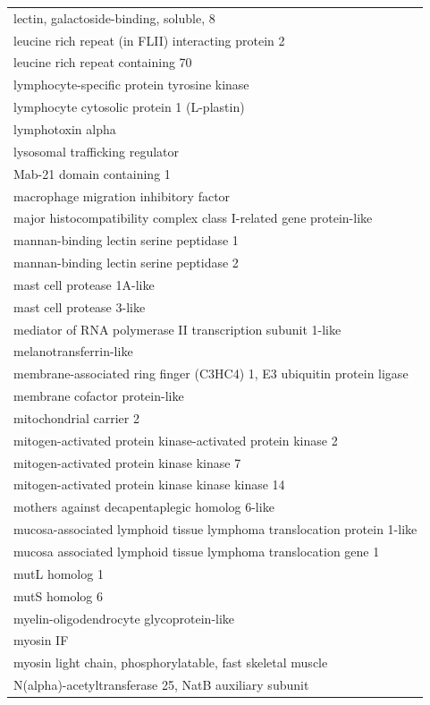 \documentclass[english]{article}\usepackage[]{graphicx}\usepackage[]{color}
\begin{document}
\begin{longtable}{l}
lectin, galactoside-binding, soluble, 8 \\ 
leucine rich repeat (in FLII) interacting protein 2 \\ 
leucine rich repeat containing 70 \\ 
lymphocyte-specific protein tyrosine kinase \\ 
lymphocyte cytosolic protein 1 (L-plastin) \\ 
lymphotoxin alpha \\ 
lysosomal trafficking regulator \\ 
Mab-21 domain containing 1 \\ 
macrophage migration inhibitory factor \\ 
major histocompatibility complex class I-related gene protein-like \\ 
mannan-binding lectin serine peptidase 1  \\ 
mannan-binding lectin serine peptidase 2 \\ 
mast cell protease 1A-like \\ 
mast cell protease 3-like \\ 
mediator of RNA polymerase II transcription subunit 1-like \\ 
melanotransferrin-like \\ 
membrane-associated ring finger (C3HC4) 1, E3 ubiquitin protein ligase \\ 
membrane cofactor protein-like \\ 
mitochondrial carrier 2 \\ 
mitogen-activated protein kinase-activated protein kinase 2 \\ 
mitogen-activated protein kinase kinase 7 \\ 
mitogen-activated protein kinase kinase kinase 14 \\ 
mothers against decapentaplegic homolog 6-like \\ 
mucosa-associated lymphoid tissue lymphoma translocation protein 1-like \\ 
mucosa associated lymphoid tissue lymphoma translocation gene 1 \\ 
mutL homolog 1 \\ 
mutS homolog 6 \\ 
myelin-oligodendrocyte glycoprotein-like \\ 
myosin IF \\ 
myosin light chain, phosphorylatable, fast skeletal muscle \\ 
N(alpha)-acetyltransferase 25, NatB auxiliary subunit \\ 

\end{longtable}
\end{document}
